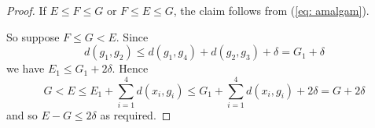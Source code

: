 \documentclass[10pt,a4paper]{amsart}
\renewcommand{\d}{\delta}
\begin{document}
\begin{proof}
If $E\leq F\leq G$ or $F\leq E\leq G$,  the claim follows from (\ref{eq: amalgam}).

\medskip
So suppose $F\leq G<E$. Since
\[d(g_1,g_2)\leq d(g_1,g_4)+d(g_2,g_3)+\d=G_1+\d\]
we have $E_1\leq G_1+2\d$. Hence 
\[G<E\leq E_1+ \sum_{i=1}^4 d(x_i,g_i) \leq G_1+ \sum_{i=1}^4 d(x_i,g_i)+2\d= G+2\d\] and so $E-G\leq 2\d$ as required.



\end{proof}
\end{document}
